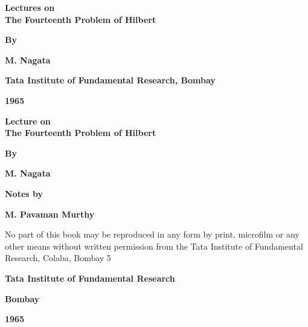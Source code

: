 \thispagestyle{empty}
\begin{center}
{\Large\bf Lectures on}\\[5pt]
{\Large\bf The Fourteenth Problem of Hilbert}
\vskip 1cm

{\bf By}
\medskip

{\large\bf M. Nagata}
\vfill

{\bf Tata Institute of Fundamental Research, Bombay}

{\bf 1965}
\end{center}

\eject


\thispagestyle{empty}

\begin{center}
{\Large\bf Lecture on}\\[5pt]
{\Large\bf The Fourteenth Problem of Hilbert}
\vskip 1cm

{\bf By}
\medskip

{\large\bf M. Nagata}
\vfill

{\bf Notes by}
\bigskip

{\large\bf M. Pavaman Murthy}
\vfill

\parbox{0.7\textwidth}{No part of this book may be reproduced
in any form by print, microfilm or any
other means without written permission
from the Tata Institute of Fundamental
Research, Colaba, Bombay 5}
\vfill

{\bf Tata Institute of Fundamental Research}

{\bf Bombay}

{\bf 1965}
\end{center}

\eject
